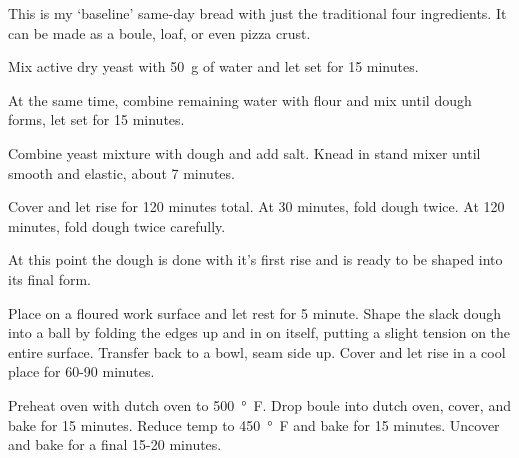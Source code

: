 
This is my `baseline' same-day bread with just the traditional four ingredients. It can be made as a boule, loaf, or even pizza crust.


Mix active dry yeast with \SI{50}{g} of water and let set for 15 minutes.


\begin{ingredients}
\end{ingredients}

At the same time, combine remaining water with flour and mix until dough forms, let set for 15 minutes.

Combine yeast mixture with dough and add salt. Knead in stand mixer until smooth and elastic, about 7 minutes.

Cover and let rise for 120 minutes total.
At 30 minutes, fold dough twice.
At 120 minutes, fold dough twice carefully.

At this point the dough is done with it's first rise and is ready to be shaped into its final form.


Place on a floured work surface and let rest for 5 minute. Shape the slack dough into a ball by folding the edges up and in on itself, putting a slight tension on the entire surface. Transfer back to a bowl, seam side up. Cover and let rise in a cool place for 60-90 minutes.

Preheat oven with dutch oven to \SI{500}{°F}. Drop boule into dutch oven, cover, and bake for 15 minutes. Reduce temp to \SI{450}{°F} and bake for 15 minutes. Uncover and bake for a final 15-20 minutes.
